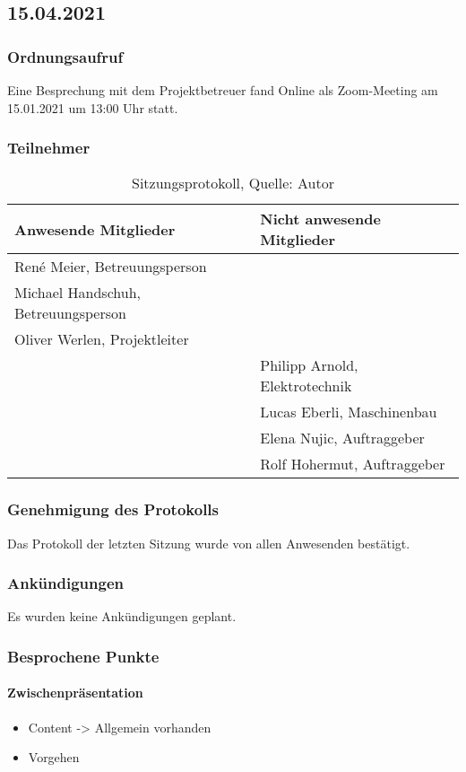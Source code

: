 \subsection{15.04.2021}
\subsubsection{Ordnungsaufruf}
Eine Besprechung mit dem Projektbetreuer fand Online als Zoom-Meeting am 15.01.2021 um 13:00 Uhr statt.
\subsubsection{Teilnehmer}
\begin{table}[H]
	\setlength\extrarowheight{2pt} %
	\begin{tabularx}{\textwidth}{|X|X|}
		\hline
		\textbf{Anwesende Mitglieder} &  \textbf{Nicht anwesende Mitglieder} \\
		\hline
		 René Meier, Betreuungsperson &  \\
		 Michael Handschuh, Betreuungsperson &   \\
		Oliver Werlen, Projektleiter &  \\
		& Philipp Arnold, Elektrotechnik  \\
		& Lucas Eberli, Maschinenbau \\
		& Elena Nujic, Auftraggeber  \\
		& Rolf Hohermut, Auftraggeber  \\
		\hline
	\end{tabularx}
	\caption{ \label{tbl: Teilnehmerliste vom 15.04.2021}Sitzungsprotokoll, Quelle: Autor}
\end{table}
\subsubsection{Genehmigung des Protokolls}
Das Protokoll der letzten Sitzung wurde von allen Anwesenden bestätigt.
\subsubsection{Ankündigungen}
Es wurden keine Ankündigungen geplant.
\subsubsection{Besprochene Punkte}
\paragraph{Zwischenpräsentation}
\begin{itemize}
	\item Content -> Allgemein vorhanden
	\item Vorgehen 
\end{itemize}

